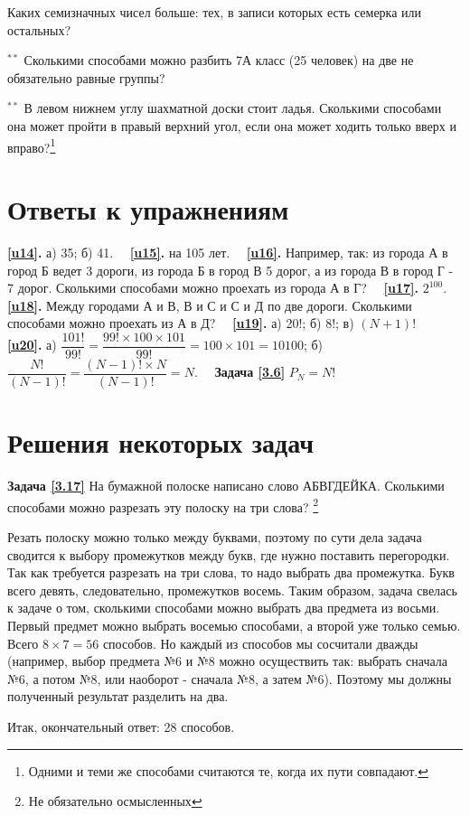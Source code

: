 \begin{thm}
	Каких семизначных чисел больше: тех, в записи которых есть семерка или остальных?
\end{thm}

\begin{thm}$^{\ast\ast}$
	Сколькими способами можно разбить 7А класс (25 человек) на две не обязательно равные группы?
\end{thm}

\begin{thm}$^{\ast\ast}$
	В левом нижнем углу шахматной доски стоит ладья. Сколькими способами она может пройти в правый верхний угол, если она может ходить только вверх и вправо?\footnote{Одними и теми же способами считаются те, когда их пути совпадают.}
\end{thm}
\newpage 

\section{Ответы к упражнениям}
\textbf{\ref{u14}.}	а) 35; б) 41.~~ \textbf{\ref{u15}.} на 105 лет.~~ \textbf{\ref{u16}.} Например, так: из города А в город Б ведет 3 дороги, из города Б в город В 5 дорог, а из города В в город Г - 7 дорог. Сколькими способами можно проехать из города А в Г?~~\textbf{ \ref{u17}.} $2^{100}$.~~ \textbf{\ref{u18}.} Между городами А и В, В и С и С и Д по две дороги. Сколькими способами можно проехать из А в Д?~~ \textbf{\ref{u19}.} а) 20!; б) 8!;  в) $(N+1)!$~~  \textbf{\ref{u20}.} а) $ \dfrac{101!}{99!}=\dfrac{99!\times 100\times 101}{99!} = 100\times 101 = 10100$; б) $\dfrac{N!}{(N-1)!} =\dfrac{(N-1)!\times N}{(N-1)!} = N$.~~ \textbf{Задача \ref{3.6}}  $P_N=N!$
\section{Решения некоторых задач}
\textbf{Задача \ref{3.17}}
	На бумажной полоске написано слово АБВГДЕЙКА. Сколькими способами можно разрезать эту полоску на три слова? \footnote{Не обязательно осмысленных}

\begin{prf}
	Резать полоску можно только между буквами, поэтому по сути дела задача сводится к выбору промежутков между букв, где нужно поставить перегородки. Так как требуется разрезать на три слова, то надо выбрать два промежутка. Букв всего девять, следовательно, промежутков восемь. Таким образом, задача свелась к задаче о том, сколькими способами можно выбрать два предмета из восьми. Первый предмет можно выбрать восемью способами, а второй уже только семью. Всего $8\times7=56$ способов. Но каждый из способов мы сосчитали дважды (например, выбор предмета №6 и №8 можно осуществить так: выбрать сначала №6, а потом №8, или наоборот - сначала №8, а затем №6). Поэтому мы должны полученный результат разделить на два. 
 
 Итак, окончательный ответ: 28 способов.
\end{prf}